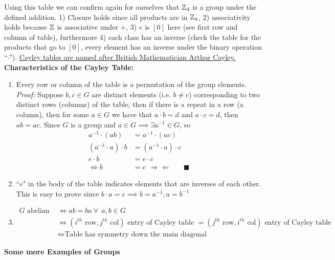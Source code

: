 Using this table we can confirm again for ourselves that ${\mathbb{ Z}}_4$ is a group under the defined addition. 1) Closure holds since all products are in ${\mathbb{ Z}}_4$, 2) associativity holds because ${\mathbb{ Z}}$ is associative under $+$, 3) $e$ is $[0]$ here (see first row and column of table), furthermore 4) each class has an inverse (check the table for the products that go to $[0]$, every element has an inverse under the binary operation ``$\cdot$"). \href{https://en.wikipedia.org/wiki/Arthur_Cayley}{Cayley tables are named after British Mathematician Arthur Cayley.}\\
\newpage
\noindent\textbf{Characteristics of the Cayley Table:}
\begin{enumerate}
    \item Every row or column of the table is a permutation of the group elements.\\
    \textit{Proof:} Suppose $b,c\in G$ are distinct elements (i.e. $b\neq c$) corresponding to two distinct rows (columns) of the table, then if there is a repeat in a row (a column), then for some $a\in G$ we have that $a\cdot b=d$ and $a\cdot c=d$, then $ab=ac$. Since $G$ is a group and $a\in G \implies \exists a^{-1}\in G $, so
    \begin{align}
        a^{-1}\cdot (ab)&=a^{-1}\cdot (ac) \nonumber \\
        (a^{-1}\cdot a)\cdot b&=(a^{-1}\cdot a)\cdot c \nonumber \\
        e\cdot b&=e\cdot c \nonumber \\
        \iff b&=c \ \ \Rightarrow\Leftarrow \ \ \ \ \ \ \ \ \blacksquare \nonumber
    \end{align}
    \item ``$e$" in the body of the table indicates elements that are inverses of each other. This is easy to prove since $b\cdot a= e \implies b=a^{-1}, a=b^{-1} $
    \item \begin{align}
        G \text{ abelian } &\iff ab=ba \ \forall \ \ a,b \in G \nonumber \\
        &\iff (i^{th} \text{ row}, j^{th} \text{ col}) \text{ entry of Cayley table } = (j^{th} \text{ row}, i^{th} \text{ col}) \text{ entry of Cayley table } \nonumber \\
        &\iff \text{Table has symmetry down the main diagonal} \nonumber
    \end{align}
\end{enumerate}

\noindent\textbf{Some more Examples of Groups}

